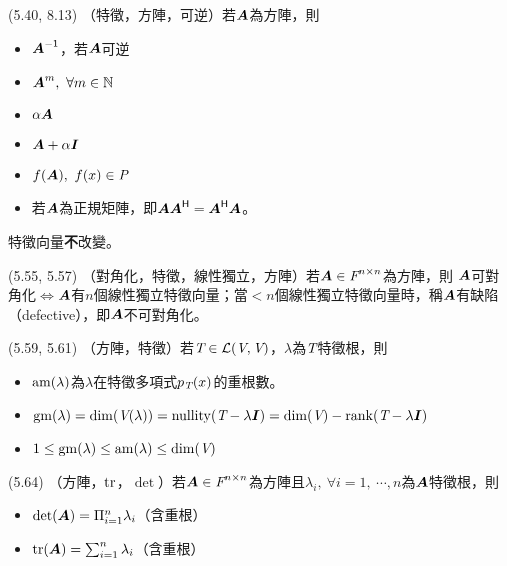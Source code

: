 \item \begin{theorem}{(5.40, 8.13)} （特徵，方陣，可逆）若$\boldsymbol{A}$為方陣，則
	\begin{itemize}
		\item $\boldsymbol{A}^{\mathsf{-1}}$，若$\boldsymbol{A}$可逆
		\item $\boldsymbol{A}^m, \ \forall m \in \mathbb{N}$
		\item $\alpha\boldsymbol{A}$
		\item $\boldsymbol{A} + \alpha\boldsymbol{I}$
		\item $f(\boldsymbol{A}), \ f(x) \in \textit{P}$
		\item 若$\boldsymbol{A}$為正規矩陣，即$\boldsymbol{A}\boldsymbol{A}^{\mathsf{H}} = \boldsymbol{A}^{\mathsf{H}}\boldsymbol{A}$。
	\end{itemize}
	特徵向量\textbf{不}改變。
\end{theorem}

\item \begin{theorem}{(5.55, 5.57)} （對角化，特徵，線性獨立，方陣）若$\boldsymbol{A} \in \textit{F}^{n \times n}$為方陣，則
	$\boldsymbol{A}$可對角化$\iff$$\boldsymbol{A}$有$n$個線性獨立特徵向量；當$< n$個線性獨立特徵向量時，稱$\boldsymbol{A}$有缺陷（defective），即$\boldsymbol{A}$不可對角化。
\end{theorem}

\item \begin{theorem}{(5.59, 5.61)} （方陣，特徵）若$\textit{T} \in \mathcal{L}(\textit{V}, \textit{V})$，$\lambda$為$\textit{T}$特徵根，則
	\begin{itemize}
		\item $\operatorname{am}(\lambda)$為$\lambda$在特徵多項式$p_{\textit{T}}(x)$的重根數。
		\item $\operatorname{gm}(\lambda) = \dim(\textit{V}(\lambda)) = \operatorname{nullity}(\textit{T} - \lambda\boldsymbol{I}) = \dim(\textit{V}) - \operatorname{rank}(\textit{T} - \lambda\boldsymbol{I})$
		\item $1 \le \operatorname{gm}(\lambda) \le \operatorname{am}(\lambda) \le \dim(\textit{V})$
	\end{itemize}
\end{theorem}

\item \begin{theorem}{(5.64)} （方陣，$\operatorname{tr}$，$\det$）若$\boldsymbol{A} \in \textit{F}^{n \times n}$為方陣且$\lambda_i, \ \forall i = 1, \ \cdots, n$為$\boldsymbol{A}$特徵根，則
	\begin{itemize}
		\item $\det(\boldsymbol{A}) = \Pi_{i = 1}^{n}\lambda_i$（含重根）
		\item $\operatorname{tr}(\boldsymbol{A}) = \sum_{i = 1}^{n}\lambda_i$（含重根）
	\end{itemize}
\end{theorem}

